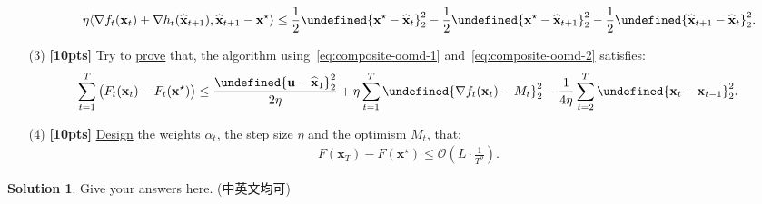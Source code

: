 \documentclass[a4paper]{article}
\numberwithin{equation}{section}
\theoremstyle{definition}
\newtheorem*{solution}{Solution}
\newcommand\inner[2]{\langle #1, #2 \rangle}
\theoremstyle{definition}
\def \O {\mathcal{O}}
\def \u {\textbf{u}}
\def \x {\textbf{x}}
\def \xs {\x^\star}
\def \xh {\widehat{\x}}
\def \xh {\widehat{\x}}
\let\norm\undefined
\DeclarePairedDelimiter\norm{\lVert}{\rVert}
\begin{document}
\begin{enumerate}
\begin{enumerate}
    \label{eq:composite-bregman}
    \begin{align*}  
      \eta \inner{\nabla f_t(\x_t) + \nabla h_t(\xh_{t+1})}{\xh_{t+1} - \xs} \le \frac{1}{2}\norm{\xs - \xh_t}_2^2 - \frac{1}{2}\norm{\xs - \xh_{t+1}}_2^2 - \frac{1}{2}\norm{\xh_{t+1} - \xh_t}_2^2.
    \end{align*}
  \end{enumerate}
  \item[(3)] \textbf{[10pts]} Try to \underline{prove} that, the algorithm using~\eqref{eq:composite-oomd-1} and~\eqref{eq:composite-oomd-2} satisfies:
  \begin{align*}
    \sum_{t=1}^T \big( F_t(\x_t) - F_t(\xs) \big) \le \frac{\norm{\u - \xh_1}_2^2}{2\eta} + \eta \sum_{t=1}^{T} \norm{\nabla f_t(\x_t) - M_t}_2^2 - \frac{1}{4\eta}\sum_{t=2}^{T}\norm{\x_t - \x_{t-1}}_2^2.
  \end{align*}
  \item[(4)] \textbf{[10pts]} \underline{Design} the weights $\alpha_t$, the step size $\eta$ and the optimism $M_t$,  that:
  \begin{align*}
    F(\overline{\x}_T) - F(\xs) \le \O\left(L\cdot\frac{1}{T^2}\right).
  \end{align*}
\end{enumerate}

\begin{solution}
  Give your answers here. (中英文均可)
  ~\\
  ~\\
  ~\\
\end{solution}


\newpage
\end{document}

